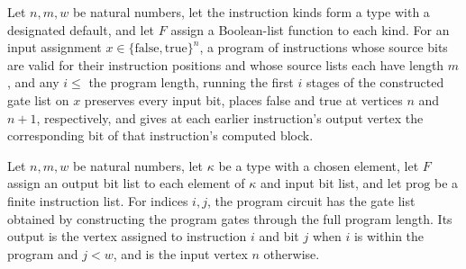\begin{theorem}
\label{BoolCircuit.progGates_values}
\leanok
{}
Let $n,m,w$ be natural numbers, let the instruction kinds form a type with a designated
default, and let $F$ assign a Boolean-list function to each kind. For an input
assignment $x\in\{\mathrm{false},\mathrm{true}\}^n$, a program of instructions whose
source bits are valid for their instruction positions and whose source lists each have
length $m$, and any $i\leq$ the program length, running the first $i$ stages of the
constructed gate list on $x$ preserves every input bit, places false and true at
vertices $n$ and $n+1$, respectively, and gives at each earlier instruction's output
vertex the corresponding bit of that instruction's computed block.
\end{theorem}

\begin{definition}
\label{BoolCircuit.progCircuit}
\leanok
{}
Let $n,m,w$ be natural numbers, let $\kappa$ be a type with a chosen element, let $F$
assign an output bit list to each element of $\kappa$ and input bit list, and let
$\mathrm{prog}$ be a finite instruction list. For indices $i,j$, the program circuit has the
gate list obtained by constructing the program gates through the full program length.
Its output is the vertex assigned to instruction $i$ and bit $j$ when $i$ is within the
program and $j<w$, and is the input vertex $n$ otherwise.
\end{definition}

